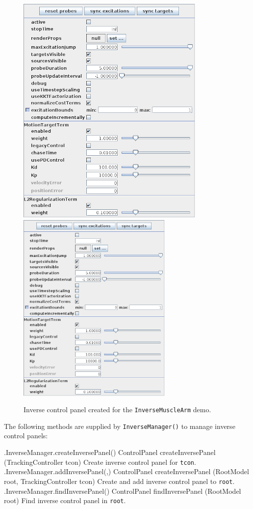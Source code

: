 \begin{figure}[ht]
\begin{center}
\iflatexml
   \includegraphics[]{images/InverseControlPanel}
\else
   \includegraphics[width=3in]{images/InverseControlPanel}
\fi
\end{center}
\caption{Inverse control panel created for the {\tt InverseMuscleArm} demo.}
\label{InverseControlPanel:fig}
\end{figure}

The following methods are supplied by {\tt InverseManager()} to manage inverse
control panels:
%
\begin{methodtable}{0.6}{0.4}
\midline
%
\methodentry
{\inverse.InverseManager.createInversePanel()}%
{ControlPanel createInversePanel (TrackingController tcon)}%
{Create inverse control panel for {\tt tcon}.}%
%
\methodentry
{\inverse.InverseManager.addInversePanel(,)}%
{ControlPanel createInversePanel (RootModel root, \brh TrackingController tcon)}%
{Create and add inverse control panel to {\tt root}.}%
%
\methodentry
{\inverse.InverseManager.findInversePanel()}%
{ControlPanel findInversePanel (RootModel root)}%
{Find inverse control panel in {\tt root}.}%
%
\midline
\end{methodtable}
%

